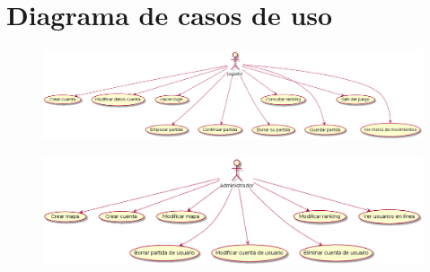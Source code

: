 \section{Diagrama de casos de uso}\label{sec:uc}




  \begin{figure}[ht]
  \centering
  \includegraphics[width=1\textwidth]{./imatges/Jugador.png}
  \label{fig:usecase}
   \end{figure}
   
  \begin{figure}[ht]
  \centering
  \includegraphics[width=1\textwidth]{./imatges/Administrador.png}
  \label{fig:usecase}
   \end{figure}
